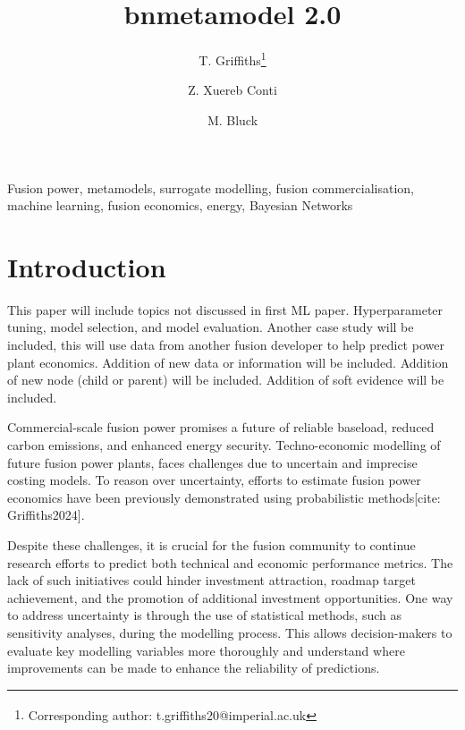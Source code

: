 \documentclass[lettersize,journal]{IEEEtran}
\begin{document}
\title{bnmetamodel 2.0}



\author[1]{T. Griffiths\thanks{\textsuperscript{\Cross}Corresponding author: t.griffiths20@imperial.ac.uk}}
\author[2]{Z. Xuereb Conti}
\author[1]{M. Bluck}

\vspace{-15pt}

\maketitle

\begin{abstract}

\end{abstract}

\begin{IEEEkeywords}
Fusion power, metamodels, surrogate modelling, fusion commercialisation, machine learning, fusion economics, energy, Bayesian Networks
\end{IEEEkeywords}
\vspace{-2ex}

\section{Introduction}
This paper will include topics not discussed in first ML paper. Hyperparameter tuning, model selection, and model evaluation. Another case study will be included, this will use data from another fusion developer to help predict power plant economics. Addition of new data or information will be included. Addition of new node (child or parent) will be included. Addition of soft evidence will be included.

Commercial-scale fusion power promises a future of reliable baseload, reduced carbon emissions, and enhanced energy security. Techno-economic modelling of future fusion power plants, faces challenges due to uncertain and imprecise costing models. To reason over uncertainty, efforts to estimate fusion power economics have been previously demonstrated using probabilistic methods[cite: Griffiths2024].

Despite these challenges, it is crucial for the fusion community to continue research efforts to predict both technical and economic performance metrics. The lack of such initiatives could hinder investment attraction, roadmap target achievement, and the promotion of additional investment opportunities. One way to address uncertainty is through the use of statistical methods, such as sensitivity analyses, during the modelling process. This allows decision-makers to evaluate key modelling variables more thoroughly and understand where improvements can be made to enhance the reliability of predictions.
\end{document}
